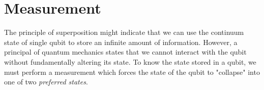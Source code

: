 \documentclass[12pt,twoside,fleqn]{report}
\makeatletter
\theoremstyle{thmstyle}
\renewenvironment{proof}[1][\proofname]{\par
\pushQED{\qed}%
\normalfont \topsep6\p@\@plus6\p@\relax
\trivlist
\item[\hskip\labelsep\itshape#1\@addpunct{.}]\mbox{}\par\nobreak\ignorespaces
}{%
    \popQED\endtrivlist\@endpefalse
    }
\newtheorem{prop}{Proposition}[chapter]
\makeatother
\begin{document}
\begin{comment}
\begin{prop}
    The set of seperable states has measure 0.
\end{prop}


\begin{proof}[intuition]
    refer https://physics.stackexchange.com/questions/268831/are-there-more-entangled-states-or-non-entangled-ones 

    Consider a state $\ket{\psi} = a \ket{0} + b \ket{1} \in \mathcal{H}_1$, $a,b \in \mathbb{C}$. Since $a$ and $b$ are complex coefficients, we would have $4$ degrees of freedom to assign a particular $\ket{\psi}$. However including the constraints that $a^2 + b^2 = 1$ and that multiplying by global phase leaves the state unchanged, we are effectively left with $2$ degrees of freedom for assigning $\ket{\psi}$. 
    
Similarly assigning $\ket{\phi} \in \mathcal{H}_2$ has $2$ degrees of freedom.

    Consider the $4$-dimensional tensor space $\mathcal{H}_1 \otimes \mathcal{H}_2$. Since the state of any vector $\ket{\omega}$ in this space can be written as $\ket{\omega} = a \ket{00} + b \ket{01} + c \ket{10} + d \ket{11}$, where $a, b, c, d \in \mathbb{C}$ we have $8$ degrees of freedom initially for assigning the vector $\ket{\omega}$. Including constraint $a^2 + b^2 + c^2 + d^2 = 1$ and that multiplying by global phase leaves the state unchanged, we have $6$ degrees of freedom in assigning the value of $\ket{\omega}$ which is $2$ degrees of freedom more than $4 = 2 \times 2$ from the individual qubits.
\end{proof}
\end{comment}

\section{Measurement}
The principle of superposition might indicate that we can use the continuum state of single qubit to store an infinite amount of information. However, a principal of quantum mechanics states that we cannot interact with the qubit without fundamentally altering its state. To know the state stored in a qubit, we must perform a measurement which forces the state of the qubit to "collapse" into one of two \textit{preferred states}.
\end{document}
